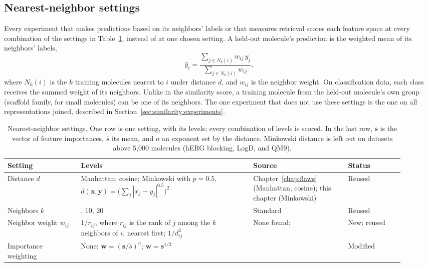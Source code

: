 \subsection{Nearest-neighbor settings}\label{sec:similarity:knn_settings}

Every experiment that makes predictions based on its neighbors' labels or that measures retrieval scores each feature space at every combination of the settings in Table~\ref{tab:knn_settings}, instead of at one chosen setting. A held-out molecule's prediction is the weighted mean of its neighbors' labels,
\begin{equation}
\hat{y}_i = \frac{\sum_{j \in N_k(i)} w_{ij}\, y_j}{\sum_{j \in N_k(i)} w_{ij}},
\label{eq:knn_weights}
\end{equation}
where $N_k(i)$ is the $k$ training molecules nearest to $i$ under distance $d$, and $w_{ij}$ is the neighbor weight. On classification data, each class receives the summed weight of its neighbors. Unlike in the similarity score, a training molecule from the held-out molecule's own group (scaffold family, for small molecules) can be one of its neighbors. The one experiment that does not use these settings is the one on all representations joined, described in Section~\ref{sec:similarity:experiments}.

\begin{table}[htbp]
\centering
\small
\begin{adjustbox}{max width=\textwidth}
\begin{tabular}{@{}>{\raggedright\arraybackslash}p{0.17\linewidth}>{\raggedright\arraybackslash}p{0.40\linewidth}>{\raggedright\arraybackslash}p{0.22\linewidth}>{\raggedright\arraybackslash}p{0.13\linewidth}@{}}
\toprule
Setting & Levels & Source & Status \\
\midrule
Distance $d$ & Manhattan; cosine; Minkowski with $p = 0.5$, $d(\mathbf{x},\mathbf{y}) = \big(\sum_j |x_j - y_j|^{0.5}\big)^{2}$ & Chapter~\ref{chap:flaws} (Manhattan, cosine); this chapter (Minkowski) & Reused \\
Neighbors $k$ & 5, 10, 20 & Standard & Reused \\
Neighbor weight $w_{ij}$ & $1/r_{ij}$, where $r_{ij}$ is the rank of $j$ among the $k$ neighbors of $i$, nearest first; $1/d_{ij}^2$ & None found; \citet{shepard1968two} & New; reused \\
Importance weighting & None; $\mathbf{w} = (\mathbf{s}/\bar{s})^{a}$; $\mathbf{w} = \mathbf{s}^{1/2}$ & \citet{Wettschereck1997} & Modified \\
\bottomrule
\end{tabular}
\end{adjustbox}
\caption[Nearest-neighbor settings]{Nearest-neighbor settings. One row is one setting, with its levels; every combination of levels is scored. In the last row, $\mathbf{s}$ is the vector of feature importances, $\bar{s}$ its mean, and $a$ an exponent set by the distance. Minkowski distance is left out on datasets above 5,000 molecules (hERG blocking, LogD, and QM9).}
\label{tab:knn_settings}
\end{table}

